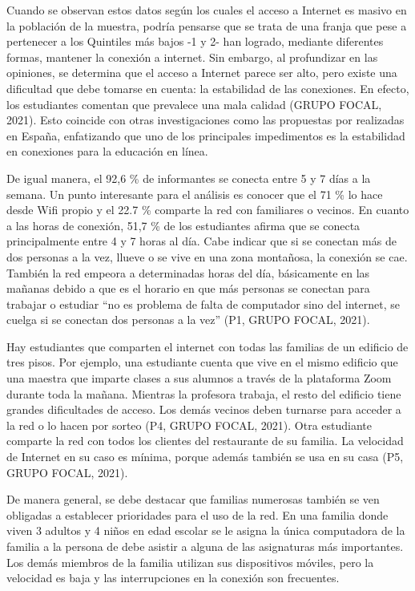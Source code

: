 \documentclass[spanish]{textolivre}
\begin{document}
Cuando se observan estos datos según los cuales el acceso a Internet es masivo en la población de la muestra, podría pensarse que se trata de una franja que pese a pertenecer a los Quintiles más bajos -1 y 2- han logrado, mediante diferentes formas, mantener la conexión a internet. Sin embargo, al profundizar en las opiniones, se determina que el acceso a Internet parece ser alto, pero existe una dificultad que debe tomarse en cuenta: la estabilidad de las conexiones. En efecto, los estudiantes comentan que prevalece una mala calidad (GRUPO FOCAL, 2021). Esto coincide con otras investigaciones como las propuestas por \textcite{pericacho_experiencias_2020} realizadas en España, enfatizando que uno de los principales impedimentos es la estabilidad en conexiones para la educación en línea.

De igual manera, el 92,6 \% de informantes se conecta entre 5 y 7 días a la semana. Un punto interesante para el análisis es conocer que el 71 \% lo hace desde Wifi propio y el 22.7 \% comparte la red con familiares o vecinos. En cuanto a las horas de conexión, 51,7 \% de los estudiantes afirma que se conecta principalmente entre 4 y 7 horas al día. Cabe indicar que si se conectan más de dos personas a la vez, llueve o se vive en una zona montañosa, la conexión se cae. También la red empeora a determinadas horas del día, básicamente en las mañanas debido a que es el horario en que más personas se conectan para trabajar o estudiar “no es problema de falta de computador sino del internet, se cuelga si se conectan dos personas a la vez” (P1, GRUPO FOCAL, 2021).

Hay estudiantes que comparten el internet con todas las familias de un edificio de tres pisos. Por ejemplo, una estudiante cuenta que vive en el mismo edificio que una maestra que imparte clases a sus alumnos a través de la plataforma Zoom durante toda la mañana. Mientras la profesora trabaja, el resto del edificio tiene grandes dificultades de acceso. Los demás vecinos deben turnarse para acceder a la red o lo hacen por sorteo (P4, GRUPO FOCAL, 2021). Otra estudiante comparte la red con todos los clientes del restaurante de su familia. La velocidad de Internet en su caso es mínima, porque además también se usa en su casa (P5, GRUPO FOCAL, 2021).

De manera general, se debe destacar que familias numerosas también se ven obligadas a establecer prioridades para el uso de la red. En una familia donde viven 3 adultos y 4 niños en edad escolar se le asigna la única computadora de la familia a la persona de debe asistir a alguna de las asignaturas más importantes. Los demás miembros de la familia utilizan sus dispositivos móviles, pero la velocidad es baja y las interrupciones en la conexión son frecuentes.
\end{document}
